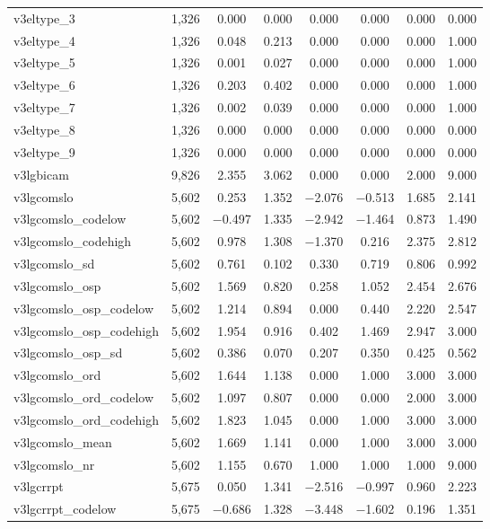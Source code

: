 \begin{table}[!htbp]
\begin{tabular}{@{\extracolsep{5pt}}lccccccc}
v3eltype\_3 & 1,326 & 0.000 & 0.000 & 0.000 & 0.000 & 0.000 & 0.000 \\ 
v3eltype\_4 & 1,326 & 0.048 & 0.213 & 0.000 & 0.000 & 0.000 & 1.000 \\ 
v3eltype\_5 & 1,326 & 0.001 & 0.027 & 0.000 & 0.000 & 0.000 & 1.000 \\ 
v3eltype\_6 & 1,326 & 0.203 & 0.402 & 0.000 & 0.000 & 0.000 & 1.000 \\ 
v3eltype\_7 & 1,326 & 0.002 & 0.039 & 0.000 & 0.000 & 0.000 & 1.000 \\ 
v3eltype\_8 & 1,326 & 0.000 & 0.000 & 0.000 & 0.000 & 0.000 & 0.000 \\ 
v3eltype\_9 & 1,326 & 0.000 & 0.000 & 0.000 & 0.000 & 0.000 & 0.000 \\ 
v3lgbicam & 9,826 & 2.355 & 3.062 & 0.000 & 0.000 & 2.000 & 9.000 \\ 
v3lgcomslo & 5,602 & 0.253 & 1.352 & $-$2.076 & $-$0.513 & 1.685 & 2.141 \\ 
v3lgcomslo\_codelow & 5,602 & $-$0.497 & 1.335 & $-$2.942 & $-$1.464 & 0.873 & 1.490 \\ 
v3lgcomslo\_codehigh & 5,602 & 0.978 & 1.308 & $-$1.370 & 0.216 & 2.375 & 2.812 \\ 
v3lgcomslo\_sd & 5,602 & 0.761 & 0.102 & 0.330 & 0.719 & 0.806 & 0.992 \\ 
v3lgcomslo\_osp & 5,602 & 1.569 & 0.820 & 0.258 & 1.052 & 2.454 & 2.676 \\ 
v3lgcomslo\_osp\_codelow & 5,602 & 1.214 & 0.894 & 0.000 & 0.440 & 2.220 & 2.547 \\ 
v3lgcomslo\_osp\_codehigh & 5,602 & 1.954 & 0.916 & 0.402 & 1.469 & 2.947 & 3.000 \\ 
v3lgcomslo\_osp\_sd & 5,602 & 0.386 & 0.070 & 0.207 & 0.350 & 0.425 & 0.562 \\ 
v3lgcomslo\_ord & 5,602 & 1.644 & 1.138 & 0.000 & 1.000 & 3.000 & 3.000 \\ 
v3lgcomslo\_ord\_codelow & 5,602 & 1.097 & 0.807 & 0.000 & 0.000 & 2.000 & 3.000 \\ 
v3lgcomslo\_ord\_codehigh & 5,602 & 1.823 & 1.045 & 0.000 & 1.000 & 3.000 & 3.000 \\ 
v3lgcomslo\_mean & 5,602 & 1.669 & 1.141 & 0.000 & 1.000 & 3.000 & 3.000 \\ 
v3lgcomslo\_nr & 5,602 & 1.155 & 0.670 & 1.000 & 1.000 & 1.000 & 9.000 \\ 
v3lgcrrpt & 5,675 & 0.050 & 1.341 & $-$2.516 & $-$0.997 & 0.960 & 2.223 \\ 
v3lgcrrpt\_codelow & 5,675 & $-$0.686 & 1.328 & $-$3.448 & $-$1.602 & 0.196 & 1.351 \\ 

\end{tabular}
\end{table}
